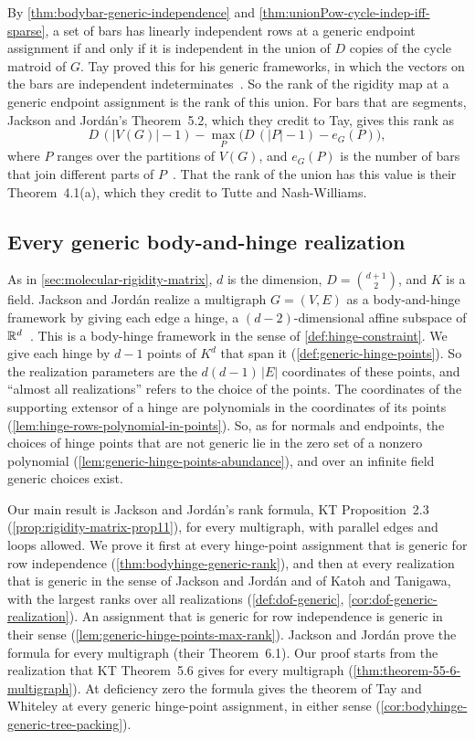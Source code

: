 By \cref{thm:bodybar-generic-independence} and
\cref{thm:unionPow-cycle-indep-iff-sparse}, a set of bars has linearly
independent rows at a generic endpoint assignment if and only if it is
independent in the union of $D$ copies of the cycle matroid of $G$.
Tay proved this for his generic frameworks, in which the vectors on
the bars are independent indeterminates~\cite[Corollary~5.4]{tay1984}.
So the rank of the rigidity map at a generic endpoint assignment is
the rank of this union. For bars that are segments, Jackson and
Jord\'an's Theorem~5.2, which they credit to Tay, gives this rank as
\[
  D\,(|V(G)| - 1) - \max_P \bigl( D\,(|P| - 1) - e_G(P) \bigr),
\]
where $P$ ranges over the partitions of $V(G)$, and $e_G(P)$ is the
number of bars that join different parts of
$P$~\cite[\S5]{jacksonJordan2009}. That the rank of the union has
this value is their Theorem~4.1(a), which they credit to Tutte and
Nash-Williams.

\subsection{Every generic body-and-hinge realization}
\label{sec:generic-lift-bodyhinge}

As in \cref{sec:molecular-rigidity-matrix}, $d$ is the dimension,
$D = \binom{d+1}{2}$, and $K$ is a field. Jackson and Jord\'an realize
a multigraph $G = (V, E)$ as a body-and-hinge framework by giving each
edge a hinge, a $(d-2)$-dimensional affine subspace of
${\mathbb{R}}^d$~\cite[\S3.3]{jacksonJordan2009}. This is a body-hinge framework
in the sense of \cref{def:hinge-constraint}. We give each hinge by
$d - 1$ points of $K^d$ that span it (\cref{def:generic-hinge-points}).
So the realization parameters are the $d(d-1)\,|E|$ coordinates of
these points, and ``almost all realizations'' refers to the choice of
the points. The coordinates of the supporting extensor of a hinge are
polynomials in the coordinates of its points
(\cref{lem:hinge-rows-polynomial-in-points}). So, as for normals and
endpoints, the choices of hinge points that are not generic lie in the
zero set of a nonzero polynomial
(\cref{lem:generic-hinge-points-abundance}), and over an infinite field
generic choices exist.

Our main result is Jackson and Jord\'an's rank formula, KT
Proposition~2.3 (\cref{prop:rigidity-matrix-prop11}), for every
multigraph, with parallel edges and loops allowed. We prove it first at
every hinge-point assignment that is generic for row independence
(\cref{thm:bodyhinge-generic-rank}), and then at every realization
that is generic in the sense of Jackson and Jord\'an and of Katoh and
Tanigawa, with the largest ranks over all realizations
(\cref{def:dof-generic}, \cref{cor:dof-generic-realization}). An assignment that is generic for
row independence is generic in their sense
(\cref{lem:generic-hinge-points-max-rank}). Jackson and
Jord\'an prove the formula for every multigraph (their Theorem~6.1).
Our proof starts from the realization that KT Theorem~5.6 gives for
every multigraph (\cref{thm:theorem-55-6-multigraph}). At deficiency
zero the formula gives the theorem of Tay and Whiteley at every generic
hinge-point assignment, in either sense
(\cref{cor:bodyhinge-generic-tree-packing}).

